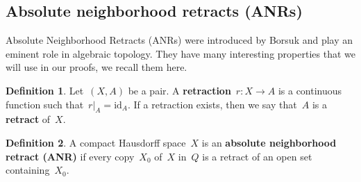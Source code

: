 \documentclass[english,11pt]{article}
\theoremstyle{plain}
\theoremstyle{remark}
\newtheorem{fact}{Fact}[section]
\theoremstyle{definition}
\newtheorem{definition}{Definition}[section]
\newcommand{\id}{\mathrm{id}}
\begin{document}
\subsection{Absolute neighborhood retracts (ANRs)}

Absolute Neighborhood Retracts (ANRs) were introduced by Borsuk \cite{Borsuk32}
and play an eminent role in algebraic topology. They have many interesting
properties that we will use in our proofs, we recall them here. 
\begin{definition}
Let~$(X,A)$ be a pair. A \textbf{retraction}~$r:X\to A$
is a continuous function such that~$r|_{A}=\id_{A}$. If a retraction
exists, then we say that~$A$ is a \textbf{retract} of~$X$. 
\end{definition}

\begin{definition}
A compact Hausdorff space~$X$ is an \textbf{absolute neighborhood retract (ANR)} if every copy~$X_0$ of~$X$ in~$Q$ is a retract of an open set containing~$X_0$.
\end{definition}

%
\end{document}
